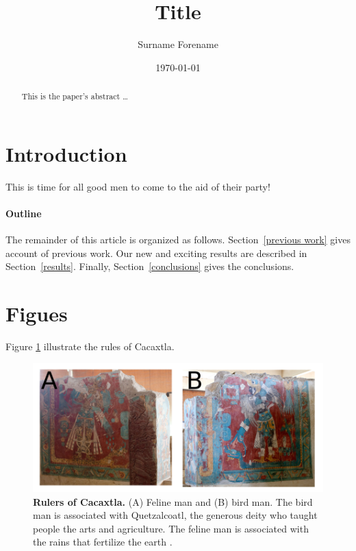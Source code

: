 \documentclass[12pt]{article}
\title{Title}
\author{Surname Forename}
\date{\today}
\begin{document}
\maketitle
\thispagestyle{empty} %



\begin{abstract}
This is the paper's abstract \ldots
\end{abstract}

\section{Introduction}
This is time for all good men to come to the aid of their party!

\paragraph{Outline}
The remainder of this article is organized as follows.
Section~\ref{previous work} gives account of previous work.
Our new and exciting results are described in Section~\ref{results}.
Finally, Section~\ref{conclusions} gives the conclusions.


\section{Figues}
Figure \ref{fig:cacaxtla} illustrate the rules of Cacaxtla.

\begin{figure}[!h]
\centering
\includegraphics[width=1.0\textwidth]{cacaxtlarulers}
    \caption{
	{\bf Rulers of Cacaxtla.}
	 (A) Feline man and (B) bird man.
	The bird man is associated with Quetzalcoatl, 
	the generous deity who taught people the arts and agriculture. 
	The feline man is associated with the rains that fertilize the earth \cite{wiki:cacaxtla}.
        }
\label{fig:cacaxtla}
\end{figure}
\end{document}

